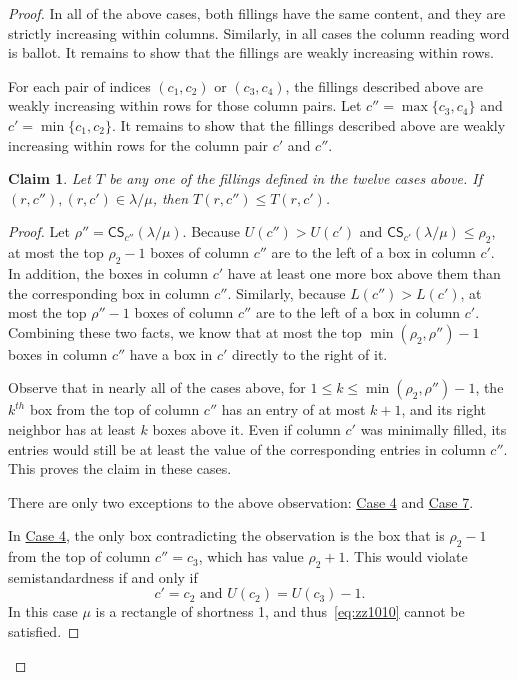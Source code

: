 \documentclass[10pt]{article}
\newtheorem{claim}[theorem]{Claim}
\theoremstyle{definition}
\newcommand{\CS	}{\mathsf{CS}}
\let\hyperlinka\hyperlink %
\begin{document}
\begin{proof}
In all of the above cases, both fillings have the same content, and they are strictly increasing within columns. Similarly, in all cases the column reading word is ballot. It remains to show that the fillings are weakly increasing within rows.

For each pair of indices $(c_1,c_2)$ or $(c_3,c_4)$, the fillings described above are weakly increasing within rows for those column pairs. Let $c'' = \max\{c_3,c_4\}$ and $c' = \min \{c_1,c_2\}$. It remains to show that the fillings described above are weakly increasing within rows for the column pair $c'$ and $c''$.

\begin{claim}
\label{claim:col2col3}
Let $T$ be any one of the fillings defined in the twelve cases above. If $(r,c''),(r,c')\in \lambda/\mu$, then $T(r,c'') \leq T(r,c')$.
\end{claim}

\begin{proof}
Let $\rho'' = \CS _{c''}(\lambda/\mu)$. Because $U(c'')>U(c')$ and $\CS _{c'}(\lambda/\mu)\leq \rho_2$, at most the top $\rho_2-1$ boxes of column $c''$ are to the left of a box in column $c'$. In addition, the boxes in column $c'$ have at least one more box above them than the corresponding box in column $c''$. Similarly, because $L(c'')>L(c')$, at most the top $\rho''-1$ boxes of column $c''$ are to the left of a box in column $c'$. Combining these two facts, we know that at most the top $\min(\rho_2,\rho'')-1$ boxes in column $c''$ have a box in $c'$ directly to the right of it.

Observe that in nearly all of the cases above, for $1\leq k\leq \min(\rho_2,\rho'')-1$, the $k^{th}$ box from the top of column $c''$ has an entry of at most $k+1$, and its right neighbor has at least $k$ boxes above it. Even if column $c'$ was minimally filled, its entries would still be at least the value of the corresponding entries in column $c''$. This proves the claim in these cases.

There are only two exceptions to the above observation: \hyperlinka{prop3.7case_4}{Case 4} and \hyperlinka{prop3.7case_7}{Case 7}.

In \hyperlinka{prop3.7case_4}{Case 4}, the only box contradicting the observation is the box that is $\rho_2-1$ from the top of column $c''=c_3$, which has value $\rho_2+1$. This would violate semistandardness if and only if
\begin{equation}
\label{eq:zz1010}
c'=c_2\text{ and }U(c_2) = U(c_3)-1.
\end{equation}
In this case $\mu$ is a rectangle of shortness 1, and thus~\eqref{eq:zz1010} cannot be satisfied.


\end{proof}
\end{proof}
\end{document}
